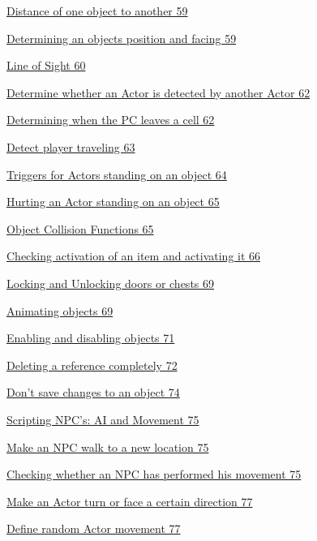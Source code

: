 \documentclass[
]{article}
\begin{document}
\protect\hyperlink{distance-of-one-object-to-another}{Distance of one
object to another 59}

\protect\hyperlink{determining-an-objects-position-and-facing}{Determining
an objects position and facing 59}

\protect\hyperlink{line-of-sight}{Line of Sight 60}

\protect\hyperlink{_Toc182634542}{Determine whether an Actor is detected
by another Actor 62}

\protect\hyperlink{determining-when-the-pc-leaves-a-cell}{Determining
when the PC leaves a cell 62}

\protect\hyperlink{detect-player-traveling}{Detect player traveling 63}

\protect\hyperlink{triggers-for-actors-standing-on-an-object}{Triggers
for Actors standing on an object 64}

\protect\hyperlink{hurting-an-actor-standing-on-an-object}{Hurting an
Actor standing on an object 65}

\protect\hyperlink{_Toc182634547}{Object Collision Functions 65}

\protect\hyperlink{checking-activation-of-an-item-and-activating-it}{Checking
activation of an item and activating it 66}

\protect\hyperlink{locking-and-unlocking-doors-or-chests}{Locking and
Unlocking doors or chests 69}

\protect\hyperlink{animating-objects}{Animating objects 69}

\protect\hyperlink{enabling-and-disabling-objects}{Enabling and
disabling objects 71}

\protect\hyperlink{deleting-a-reference-completely}{Deleting a reference
completely 72}

\protect\hyperlink{dont-save-changes-to-an-object}{Don't save changes to
an object 74}

\protect\hyperlink{scripting-npcs-ai-and-movement}{Scripting NPC's: AI
and Movement 75}

\protect\hyperlink{make-an-npc-walk-to-a-new-location}{Make an NPC walk
to a new location 75}

\protect\hyperlink{checking-whether-an-npc-has-performed-his-movement}{Checking
whether an NPC has performed his movement 75}

\protect\hyperlink{make-an-actor-turn-or-face-a-certain-direction}{Make
an Actor turn or face a certain direction 77}

\protect\hyperlink{define-random-actor-movement}{Define random Actor
movement 77}
\end{document}
